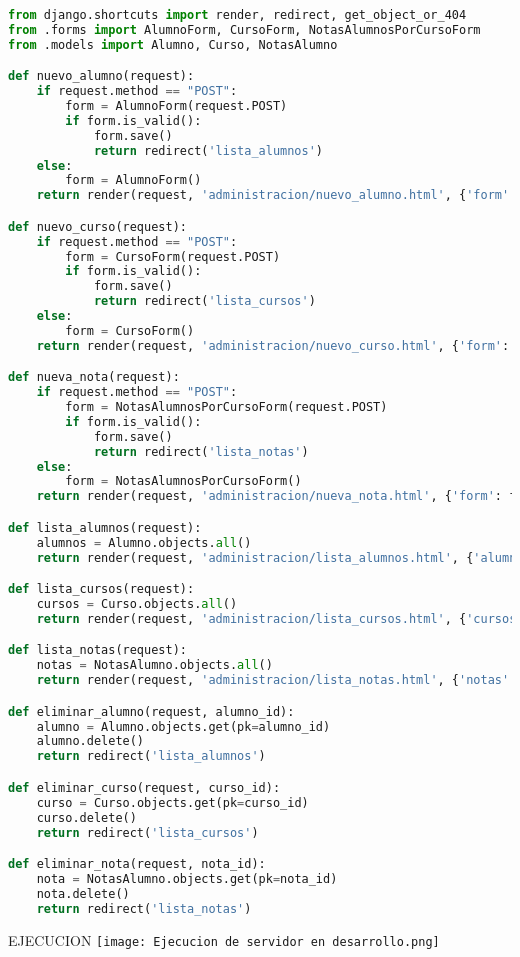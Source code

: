 \documentclass{article}
\begin{document}
        \begin{lstlisting}[language=Python, caption=views.py]
from django.shortcuts import render, redirect, get_object_or_404
from .forms import AlumnoForm, CursoForm, NotasAlumnosPorCursoForm
from .models import Alumno, Curso, NotasAlumno

def nuevo_alumno(request):
    if request.method == "POST":
        form = AlumnoForm(request.POST)
        if form.is_valid():
            form.save()
            return redirect('lista_alumnos')
    else:
        form = AlumnoForm()
    return render(request, 'administracion/nuevo_alumno.html', {'form': form})

def nuevo_curso(request):
    if request.method == "POST":
        form = CursoForm(request.POST)
        if form.is_valid():
            form.save()
            return redirect('lista_cursos')
    else:
        form = CursoForm()
    return render(request, 'administracion/nuevo_curso.html', {'form': form})

def nueva_nota(request):
    if request.method == "POST":
        form = NotasAlumnosPorCursoForm(request.POST)
        if form.is_valid():
            form.save()
            return redirect('lista_notas')
    else:
        form = NotasAlumnosPorCursoForm()
    return render(request, 'administracion/nueva_nota.html', {'form': form})

def lista_alumnos(request):
    alumnos = Alumno.objects.all()
    return render(request, 'administracion/lista_alumnos.html', {'alumnos': alumnos})

def lista_cursos(request):
    cursos = Curso.objects.all()
    return render(request, 'administracion/lista_cursos.html', {'cursos': cursos})

def lista_notas(request):
    notas = NotasAlumno.objects.all()
    return render(request, 'administracion/lista_notas.html', {'notas': notas})

def eliminar_alumno(request, alumno_id):
    alumno = Alumno.objects.get(pk=alumno_id)
    alumno.delete()
    return redirect('lista_alumnos')

def eliminar_curso(request, curso_id):
    curso = Curso.objects.get(pk=curso_id)
    curso.delete()
    return redirect('lista_cursos')

def eliminar_nota(request, nota_id):
    nota = NotasAlumno.objects.get(pk=nota_id)
    nota.delete()
    return redirect('lista_notas')
        \end{lstlisting}  

        \item EJECUCION
        \newline \newline \newline
        \texttt{[image: Ejecucion de servidor en desarrollo.png]}
        
\end{document}
